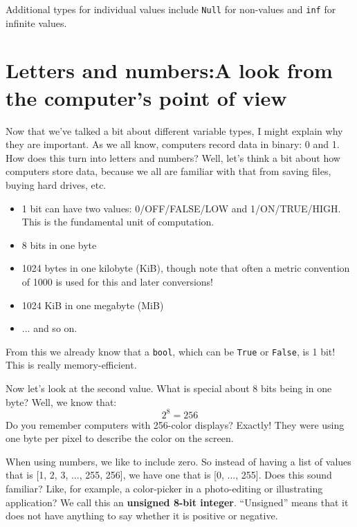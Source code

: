 \documentclass[a4paper,10pt]{scrartcl}
\begin{document}
Additional types for individual values include \lstinline{Null} for non-values and \lstinline{inf} for infinite values.

\section{Letters and numbers:A look from the computer's point of view}

Now that we've talked a bit about different variable types, I might explain why they are important. As we all know, computers record data in binary: 0 and 1. How does this turn into letters and numbers? Well, let's think a bit about how computers store data, because we all are familiar with that from saving files, buying hard drives, etc.

\begin{itemize}
 \item 1 bit can have two values: 0/OFF/FALSE/LOW and 1/ON/TRUE/HIGH. This is the fundamental unit of computation.
 \item 8 bits in one byte
 \item 1024 bytes in one kilobyte (KiB), though note that often a metric convention of 1000 is used for this and later conversions!
 \item 1024 KiB in one megabyte (MiB)
 \item ... and so on.
\end{itemize}

From this we already know that a \lstinline{bool}, which can be \lstinline{True} or \lstinline{False}, is 1 bit! This is really memory-efficient.

Now let's look at the second value. What is special about 8 bits being in one byte? Well, we know that:
\begin{equation}
 2^8 = 256
\end{equation}
Do you remember computers with 256-color displays? Exactly! They were using one byte per pixel to describe the color on the screen.

When using numbers, we like to include zero. So instead of having a list of values that is [1, 2, 3, ..., 255, 256], we have one that is [0, ..., 255]. Does this sound familiar? Like, for example, a color-picker in a photo-editing or illustrating application? We call this an \textbf{unsigned 8-bit integer}. ``Unsigned'' means that it does not have anything to say whether it is positive or negative.
\end{document}
